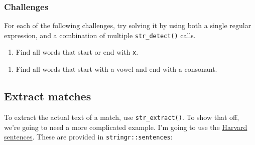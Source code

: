 \documentclass[]{book}
\newenvironment{Shaded}{\begin{snugshade}}{\end{snugshade}}
\newcommand{\CommentTok}[1]{\textcolor[rgb]{0.56,0.35,0.01}{\textit{#1}}}
\newcommand{\DataTypeTok}[1]{\textcolor[rgb]{0.13,0.29,0.53}{#1}}
\newcommand{\KeywordTok}[1]{\textcolor[rgb]{0.13,0.29,0.53}{\textbf{#1}}}
\newcommand{\NormalTok}[1]{#1}
\newcommand{\OperatorTok}[1]{\textcolor[rgb]{0.81,0.36,0.00}{\textbf{#1}}}
\newcommand{\StringTok}[1]{\textcolor[rgb]{0.31,0.60,0.02}{#1}}
\providecommand{\tightlist}{%
  \setlength{\itemsep}{0pt}\setlength{\parskip}{0pt}}
\begin{document}
\begin{Shaded}
\end{Shaded}

\hypertarget{challenges-17}{%
\subsubsection{Challenges}\label{challenges-17}}

For each of the following challenges, try solving it by using both a single regular expression, and a combination of multiple \texttt{str\_detect()} calls.

\begin{enumerate}
\def\labelenumi{\arabic{enumi}.}
\tightlist
\item
  Find all words that start or end with \texttt{x}.
\end{enumerate}

\begin{enumerate}
\def\labelenumi{\arabic{enumi}.}
\setcounter{enumi}{1}
\tightlist
\item
  Find all words that start with a vowel and end with a consonant.
\end{enumerate}

\hypertarget{extract-matches}{%
\subsection{Extract matches}\label{extract-matches}}

To extract the actual text of a match, use \texttt{str\_extract()}. To show that off, we're going to need a more complicated example. I'm going to use the \href{https://en.wikipedia.org/wiki/Harvard_sentences}{Harvard sentences}. These are provided in \texttt{stringr::sentences}:
\end{document}
